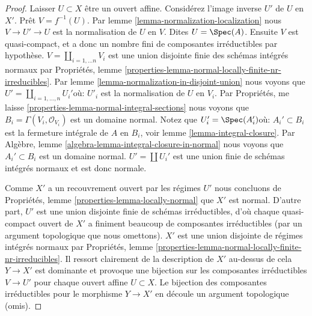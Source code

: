 \begin{proof}

Laisser $U \subset X$ être un ouvert affine. Considérez l'image inverse $U'$ de $U$ en $X'$. Prêt $V = f^{-1}(U)$. Par lemme \ref{lemma-normalization-localization}
nous $V \to U' \to U$ est la normalisation de $U$ en $V$. Dites
$U = \Spec(A)$. Ensuite $V$ est quasi-compact, et a donc un nombre fini de composantes irréductibles par hypothèse.
$V = \coprod_{i = 1, \ldots n} V_i$ est une union disjointe finie des schémas intégrés normaux par Propriétés, lemme \ref{properties-lemma-normal-locally-finite-nr-irreducibles}. Par lemme \ref{lemma-normalization-in-disjoint-union}
nous voyons que $U' = \coprod_{i = 1, \ldots, n} U_i'$où: $U'_i$ est la normalisation de $U$ en $V_i$. Par Propriétés, me laisse \ref{properties-lemma-normal-integral-sections}
nous voyons que $B_i = \Gamma(V_i, \mathcal{O}_{V_i})$ est un domaine normal. Notez que $U_i' = \Spec(A_i')$où: $A_i' \subset B_i$
est la fermeture intégrale de $A$ en $B_i$, voir lemme \ref{lemma-integral-closure}. Par Algèbre, lemme \ref{algebra-lemma-integral-closure-in-normal}
nous voyons que $A_i' \subset B_i$ est un domaine normal. $U' = \coprod U_i'$ est une union finie de schémas intégrés normaux et est donc normale.

\medskip\noindent

Comme $X'$ a un recouvrement ouvert par les régimes $U'$ nous concluons de Propriétés, lemme \ref{properties-lemma-locally-normal} que $X'$ est normal. D'autre part, $U'$ est une union disjointe finie de schémas irréductibles, d'où chaque quasi-compact ouvert de $X'$ a finiment beaucoup de composantes irréductibles (par un argument topologique que nous omettons). $X'$
est une union disjointe de régimes intégrés normaux par Propriétés, lemme \ref{properties-lemma-normal-locally-finite-nr-irreducibles}. Il ressort clairement de la description de $X'$ au-dessus de cela $Y \to X'$
est dominante et provoque une bijection sur les composantes irréductibles
$V \to U'$ pour chaque ouvert affine $U \subset X$. Le bijection des composantes irréductibles pour le morphisme $Y \to X'$
en découle un argument topologique (omis).

\end{proof}

